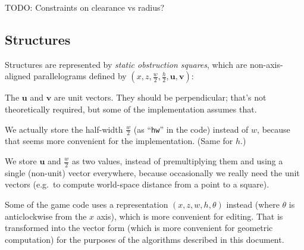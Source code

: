 \documentclass[a4paper,10pt]{article}
\begin{document}
TODO: Constraints on clearance vs radius?

\subsection{Structures}

Structures are represented by \emph{static obstruction squares},
which are non-axis-aligned parallelograms
defined by $(x, z, \frac{w}{2}, \frac{h}{2}, \mathbf{u}, \mathbf{v})$:


The $\mathbf{u}$ and $\mathbf{v}$ are unit vectors.
They should be perpendicular; that's not theoretically required,
but some of the implementation assumes that.

We actually store the half-width $\frac{w}{2}$ (as ``\texttt{hw}'' in the code)
instead of $w$, because that seems more convenient for the implementation.
(Same for $h$.)

We store $\mathbf{u}$ and $\frac{w}{2}$ as two values,
instead of premultiplying them and using a single (non-unit) vector everywhere,
because occasionally we really need the unit vectors (e.g.\ to compute
world-space distance from a point to a square).

Some of the game code uses a representation $(x, z, w, h, \theta)$ instead
(where $\theta$ is anticlockwise from the $x$ axis),
which is more convenient for editing.
That is transformed into the vector form
(which is more convenient for geometric computation)
for the purposes of the algorithms described in this document.
\end{document}
